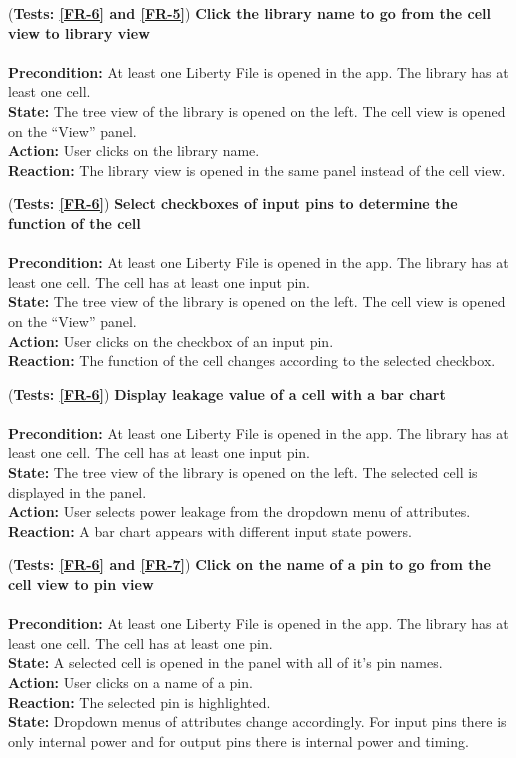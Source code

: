 \documentclass[10pt,a4paper]{report}
\newcommand{\precondition}[1]{
    \textbf{Precondition: } #1 \leavevmode \\
}
\newcommand{\action}[1]{
    \textbf{Action: } #1 \leavevmode \\
}
\newcommand{\state}[1]{
    \textbf{State: } #1 \leavevmode \\
}
\newcommand{\reaction}[1]{
    \textbf{Reaction: } #1 \leavevmode \\
}
\newcommand{\GTCDescription}[2]{
    (\textbf{Tests: #1}) \textbf{#2} \leavevmode \\
}
\begin{document}
\begin{GTC}
    \item \GTCDescription{\ref{FR-6} and \ref{FR-5}}
    {Click the library name to go from the cell view to library view} \leavevmode \\
            \precondition{At least one Liberty File is opened in the app. The library has at least one cell.} 
            \state{The tree view of the library is opened on the left. The cell view is opened on the “View” panel.}
            \action{User clicks on the library name.}
            \reaction{The library view is opened in the same panel instead of the cell view.}\label{GTC-15}
    
    \item \GTCDescription{\ref{FR-6}}
    {Select checkboxes of input pins to determine the function of the cell} \leavevmode \\ 
        \precondition{At least one Liberty File is opened in the app. The library has at least one cell. The cell has at least one input pin.}
        \state{The tree view of the library is opened on the left. The cell view is opened on the “View” panel.}
        \action{User clicks on the checkbox of an input pin. }
        \reaction{The function of the cell changes according to the selected checkbox.}\label{GTC-16}
    
    \item \GTCDescription{\ref{FR-6}}
    {Display leakage value of a cell with a bar chart} \leavevmode \\ 
        \precondition{At least one Liberty File is opened in the app. The library has at least one cell. The cell has at least one input pin.}
        \state{The tree view of the library is opened on the left. The selected cell is displayed in the panel.}
        \action{User selects power leakage from the dropdown menu of attributes.}
        \reaction{A bar chart appears with different input state powers.}\label{GTC-17}
    
    \item \GTCDescription{\ref{FR-6} and \ref{FR-7}}
    {Click on the name of a pin to go from the cell view to pin view} \leavevmode \\ 
        \precondition{At least one Liberty File is opened in the app. The library has at least one cell. The cell has at least one pin.}
        \state{A selected cell is opened in the panel with all of it's pin names.}
        \action{User clicks on a name of a pin.}
        \reaction{The selected pin is highlighted.}
        \state{Dropdown menus of attributes change accordingly. For input pins there is only internal power and for output pins there is internal power and timing.}\label{GTC-18}
    

\end{GTC}
\end{document}
